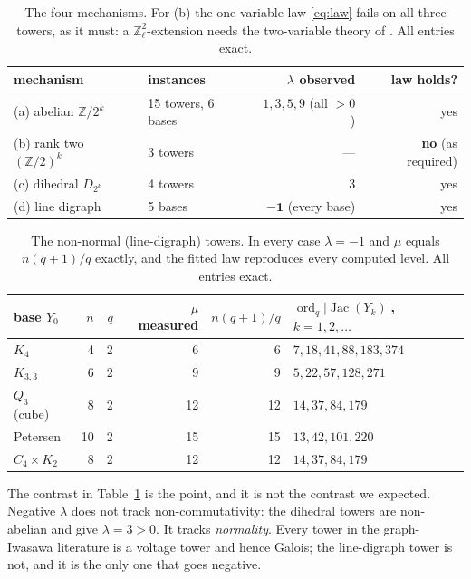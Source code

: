 \documentclass[11pt]{article}
\theoremstyle{plain}
\theoremstyle{remark}
\newcommand{\Z}{\mathbb{Z}}
\newcommand{\Zl}{\Z_\ell}
\newcommand{\Jac}{\operatorname{Jac}}
\newcommand{\ord}{\operatorname{ord}}
\begin{document}
\begin{table}[ht]
\centering\small
\begin{tabular}{llrr}
\toprule
mechanism & instances & $\lambda$ observed & law holds?\\
\midrule
(a) abelian $\Z/2^{k}$ & 15 towers, 6 bases & $1,3,5,9$ (all $>0$) & yes\\
(b) rank two $(\Z/2)^{k}$ & 3 towers & --- & \textbf{no} (as required)\\
(c) dihedral $D_{2^{k}}$ & 4 towers & $3$ & yes\\
(d) line digraph & 5 bases & $\mathbf{-1}$ (every base) & yes\\
\bottomrule
\end{tabular}
\caption{The four mechanisms. For (b) the one-variable law \eqref{eq:law} fails on all
three towers, as it must: a $\Zl^{2}$-extension needs the two-variable theory of
\cite{CM81,DV22,KM24}. All entries exact.}
\label{tab:main}
\end{table}

\begin{table}[ht]
\centering\small
\begin{tabular}{lrrrrl}
\toprule
base $Y_0$ & $n$ & $q$ & $\mu$ measured & $n(q{+}1)/q$ & $\ord_q|\Jac(Y_k)|$, $k=1,2,\dots$\\
\midrule
$K_4$          &  4 & 2 &  6 &  6 & $7,18,41,88,183,374$\\
$K_{3,3}$      &  6 & 2 &  9 &  9 & $5,22,57,128,271$\\
$Q_3$ (cube)   &  8 & 2 & 12 & 12 & $14,37,84,179$\\
Petersen       & 10 & 2 & 15 & 15 & $13,42,101,220$\\
$C_4\times K_2$&  8 & 2 & 12 & 12 & $14,37,84,179$\\
\bottomrule
\end{tabular}
\caption{The non-normal (line-digraph) towers. In every case $\lambda=-1$ and $\mu$ equals
$n(q{+}1)/q$ exactly, and the fitted law reproduces every computed level. All entries
exact.}
\label{tab:ld}
\end{table}

The contrast in Table~\ref{tab:main} is the point, and it is not the contrast we expected.
Negative $\lambda$ does not track non-commutativity: the dihedral towers are non-abelian and
give $\lambda=3>0$. It tracks \emph{normality}. Every tower in the graph-Iwasawa literature
is a voltage tower and hence Galois; the line-digraph tower is not, and it is the only one
that goes negative.
\end{document}
